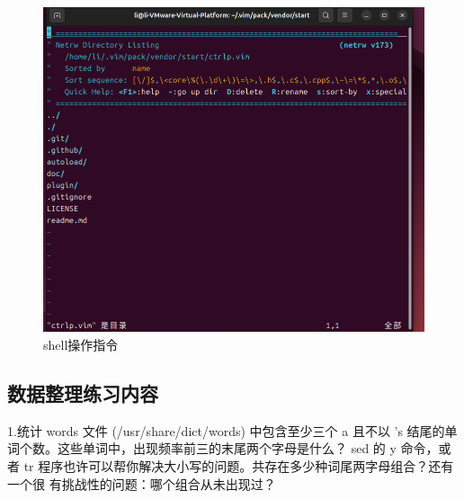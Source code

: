 \documentclass[a4paper, 12pt]{article}
\begin{document}
\begin{figure}[H]
  \centering
  \includegraphics[width=1\textwidth]{屏幕截图 2024-09-05 165950.png}
  \caption{shell操作指令}
    \end{figure}  

    
\newpage
\subsection{{\color{red}数据整理练习内容}}

\noindent 1.统计 words 文件 (/usr/share/dict/words) 中包含至少三个 a 且不以 's 结尾的单词个数。这些单词中，出现频率前三的末尾两个字母是什么？ sed 的 y 命令，或者 tr 程序也许可以帮你解决大小写的问题。共存在多少种词尾两字母组合？还有一个很 有挑战性的问题：哪个组合从未出现过？
\end{document}
